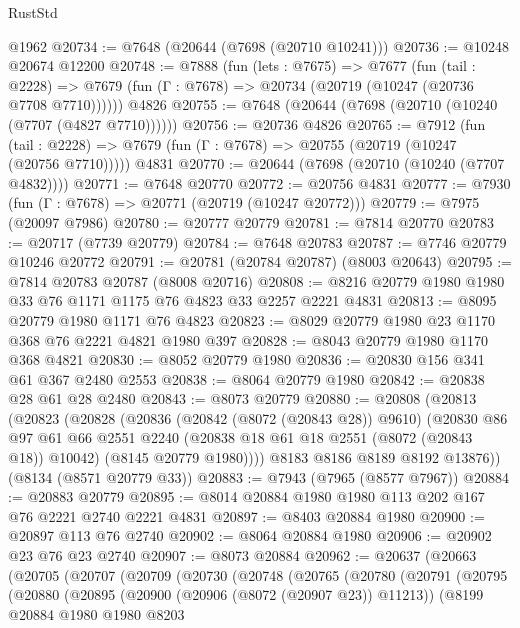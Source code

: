 \begin{lexlean}{RustStd}
\begin{coremodule}
{\begin{coremodule}
{{{{{{{{{{{{{{{{{{{{{{{{{{{{{{{{{{{{{{{{{{{{{{{{{{{{{    @1962
@20734 := @7648 (@20644 (@7698 (@20710 @10241)))
@20736 := @10248 @20674 @12200
@20748 := @7888
    (fun (lets : @7675) =>
    @7677
      (fun (tail : @2228) =>
      @7679 (fun (Γ : @7678) => @20734 (@20719 (@10247 (@20736 @7708 @7710))))))
    @4826
@20755 := @7648 (@20644 (@7698 (@20710 (@10240 (@7707 (@4827 @7710))))))
@20756 := @20736 @4826
@20765 := @7912
    (fun (tail : @2228) => @7679 (fun (Γ : @7678) => @20755 (@20719 (@10247 (@20756 @7710)))))
    @4831
@20770 := @20644 (@7698 (@20710 (@10240 (@7707 @4832))))
@20771 := @7648 @20770
@20772 := @20756 @4831
@20777 := @7930 (fun (Γ : @7678) => @20771 (@20719 (@10247 @20772)))
@20779 := @7975 (@20097 @7986)
@20780 := @20777 @20779
@20781 := @7814 @20770
@20783 := @20717 (@7739 @20779)
@20784 := @7648 @20783
@20787 := @7746 @20779 @10246 @20772
@20791 := @20781 (@20784 @20787) (@8003 @20643)
@20795 := @7814 @20783 @20787 (@8008 @20716)
@20808 := @8216 @20779 @1980 @1980 @33 @76 @1171 @1175 @76 @4823 @33 @2257 @2221 @4831
@20813 := @8095 @20779 @1980 @1171 @76 @4823
@20823 := @8029 @20779 @1980 @23 @1170 @368 @76 @2221 @4821 @1980 @397
@20828 := @8043 @20779 @1980 @1170 @368 @4821
@20830 := @8052 @20779 @1980
@20836 := @20830 @156 @341 @61 @367 @2480 @2553
@20838 := @8064 @20779 @1980
@20842 := @20838 @28 @61 @28 @2480
@20843 := @8073 @20779
@20880 := @20808
    (@20813
      (@20823
        (@20828
          (@20836
            (@20842 (@8072 (@20843 @28)) @9610)
            (@20830
              @86
              @97
              @61
              @66
              @2551
              @2240
              (@20838 @18 @61 @18 @2551 (@8072 (@20843 @18)) @10042)
              (@8145 @20779 @1980))))
        @8183
        @8186
        @8189
        @8192
        @13876))
    (@8134 (@8571 @20779 @33))
@20883 := @7943 (@7965 (@8577 @7967))
@20884 := @20883 @20779
@20895 := @8014 @20884 @1980 @1980 @113 @202 @167 @76 @2221 @2740 @2221 @4831
@20897 := @8403 @20884 @1980
@20900 := @20897 @113 @76 @2740
@20902 := @8064 @20884 @1980
@20906 := @20902 @23 @76 @23 @2740
@20907 := @8073 @20884
@20962 := @20637
    (@20663
      (@20705
        (@20707
          (@20709
            (@20730
              (@20748
                (@20765
                  (@20780
                    (@20791
                      (@20795
                        (@20880
                          (@20895
                            (@20900 (@20906 (@8072 (@20907 @23)) @11213))
                            (@8199
                              @20884
                              @1980
                              @1980
                              @8203
}}}}}}}}}}}}}}}}}}}}}}}}}}}}}}}}}}}}}}}}}}}}}}}}}}}}}
\end{coremodule}}
\end{coremodule}
\end{lexlean}
